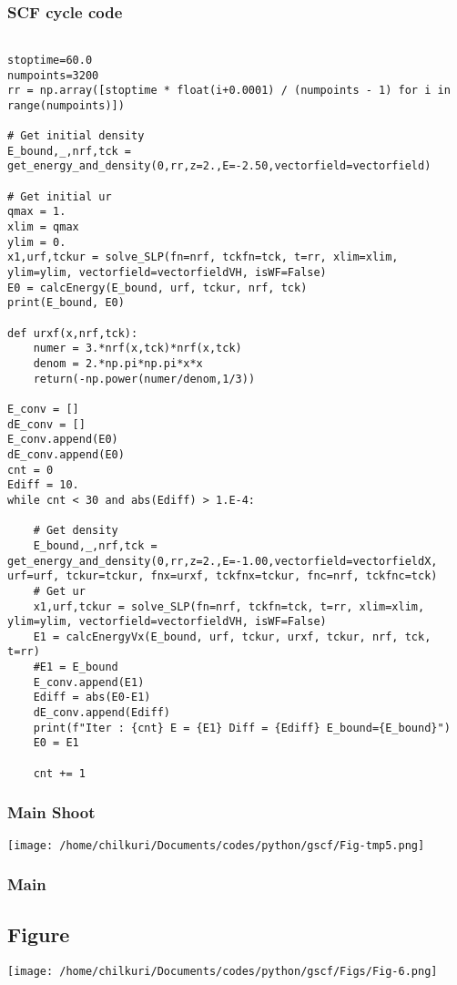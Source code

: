 \documentclass[11pt,a4paper]{article}
\begin{document}
\subsubsection{SCF cycle code}
\label{sec:orga45e335}
\begin{verbatim}

stoptime=60.0
numpoints=3200
rr = np.array([stoptime * float(i+0.0001) / (numpoints - 1) for i in range(numpoints)])

# Get initial density
E_bound,_,nrf,tck = get_energy_and_density(0,rr,z=2.,E=-2.50,vectorfield=vectorfield)

# Get initial ur
qmax = 1.
xlim = qmax
ylim = 0.
x1,urf,tckur = solve_SLP(fn=nrf, tckfn=tck, t=rr, xlim=xlim, ylim=ylim, vectorfield=vectorfieldVH, isWF=False)
E0 = calcEnergy(E_bound, urf, tckur, nrf, tck)
print(E_bound, E0)

def urxf(x,nrf,tck):
    numer = 3.*nrf(x,tck)*nrf(x,tck)
    denom = 2.*np.pi*np.pi*x*x
    return(-np.power(numer/denom,1/3))

E_conv = []
dE_conv = []
E_conv.append(E0)
dE_conv.append(E0)
cnt = 0
Ediff = 10.
while cnt < 30 and abs(Ediff) > 1.E-4:

    # Get density
    E_bound,_,nrf,tck = get_energy_and_density(0,rr,z=2.,E=-1.00,vectorfield=vectorfieldX, urf=urf, tckur=tckur, fnx=urxf, tckfnx=tckur, fnc=nrf, tckfnc=tck)
    # Get ur
    x1,urf,tckur = solve_SLP(fn=nrf, tckfn=tck, t=rr, xlim=xlim, ylim=ylim, vectorfield=vectorfieldVH, isWF=False)
    E1 = calcEnergyVx(E_bound, urf, tckur, urxf, tckur, nrf, tck, t=rr)
    #E1 = E_bound
    E_conv.append(E1)
    Ediff = abs(E0-E1)
    dE_conv.append(Ediff)
    print(f"Iter : {cnt} E = {E1} Diff = {Ediff} E_bound={E_bound}")
    E0 = E1

    cnt += 1
\end{verbatim}
\subsubsection{Main Shoot}
\label{sec:org1216902}
\begin{center}
\texttt{[image: /home/chilkuri/Documents/codes/python/gscf/Fig-tmp5.png]}
\end{center}

\subsubsection{Main}
\label{sec:orgf23c009}

\subsection{Figure}
\label{sec:org5acd386}
\begin{center}
\texttt{[image: /home/chilkuri/Documents/codes/python/gscf/Figs/Fig-6.png]}
\end{center}
\end{document}
